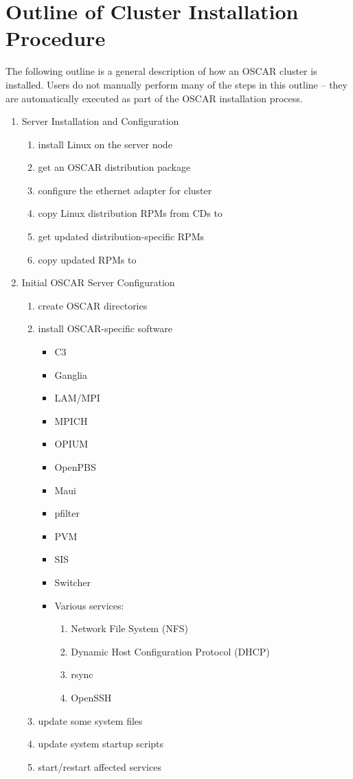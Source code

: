 %
%
%

\section{Outline of Cluster Installation Procedure}
\label{sec:outline}

The following outline is a general description of how an OSCAR cluster
is installed.  Users do not manually perform many of the steps in this
outline -- they are automatically executed as part of the OSCAR
installation process.

\begin{enumerate}
\item Server Installation and Configuration
  \begin{enumerate}
  \item install Linux on the server node
  \item get an OSCAR distribution package
  \item configure the ethernet adapter for cluster
  \item copy Linux distribution RPMs from CDs to 
  \item get updated distribution-specific RPMs
  \item copy updated RPMs to 
  \end{enumerate}
  
\item Initial OSCAR Server Configuration
  \begin{enumerate}
  \item create OSCAR directories
  \item install OSCAR-specific software
    \begin{itemize}
    \item C3
    \item Ganglia
    \item LAM/MPI
    \item MPICH
    \item OPIUM
    \item OpenPBS
    \item Maui
    \item pfilter
    \item PVM
    \item SIS
    \item Switcher
    \item Various services:
      \begin{enumerate}
      \item Network File System (NFS)
      \item Dynamic Host Configuration Protocol (DHCP)
      \item rsync
      \item OpenSSH
      \end{enumerate}
    \end{itemize}
  \item update some system files
  \item update system startup scripts
  \item start/restart affected services
  \end{enumerate}
  

\end{enumerate}
